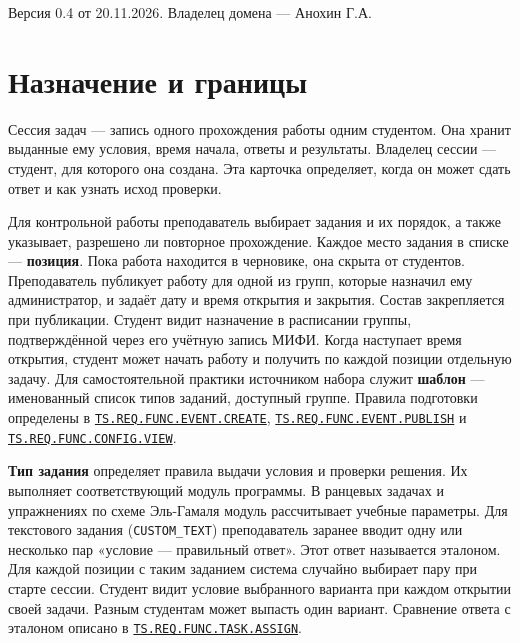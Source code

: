 \documentclass[12pt,a4paper]{article}
\begin{document}
\hypertarget{карточка-домена-сессии-задач}{}

Версия 0.4 от 20.11.2026. Владелец домена --- Анохин Г.А.

\section{Назначение и границы}\label{ux43dux430ux437ux43dux430ux447ux435ux43dux438ux435-ux438-ux433ux440ux430ux43dux438ux446ux44b}

\hypertarget{назначение-и-границы}{}

Сессия задач --- запись одного прохождения работы одним студентом. Она хранит выданные ему условия, время начала, ответы и результаты. Владелец сессии --- студент, для которого она создана. Эта карточка определяет, когда он может сдать ответ и как узнать исход проверки.

Для контрольной работы преподаватель выбирает задания и их порядок, а также указывает, разрешено ли повторное прохождение. Каждое место задания в списке --- \textbf{позиция}. Пока работа находится в черновике, она скрыта от студентов. Преподаватель публикует работу для одной из групп, которые назначил ему администратор, и задаёт дату и время открытия и закрытия. Состав закрепляется при публикации. Студент видит назначение в расписании группы, подтверждённой через его учётную запись МИФИ. Когда наступает время открытия, студент может начать работу и получить по каждой позиции отдельную задачу. Для самостоятельной практики источником набора служит \textbf{шаблон} --- именованный список типов заданий, доступный группе. Правила подготовки определены в {\href{../02\_Техническое\_задание/DOC-02\_Техническое\_задание.pdf\#ts-req-func-event-create}{\texttt{TS.\allowbreak{}REQ.\allowbreak{}FUNC.\allowbreak{}EVENT.\allowbreak{}CREATE}}}, {\href{../02\_Техническое\_задание/DOC-02\_Техническое\_задание.pdf\#ts-req-func-event-publish}{\texttt{TS.\allowbreak{}REQ.\allowbreak{}FUNC.\allowbreak{}EVENT.\allowbreak{}PUBLISH}}} и {\href{../02\_Техническое\_задание/DOC-02\_Техническое\_задание.pdf\#ts-req-func-config-view}{\texttt{TS.\allowbreak{}REQ.\allowbreak{}FUNC.\allowbreak{}CONFIG.\allowbreak{}VIEW}}}.

\textbf{Тип задания} определяет правила выдачи условия и проверки решения. Их выполняет соответствующий модуль программы. В ранцевых задачах и упражнениях по схеме Эль-Гамаля модуль рассчитывает учебные параметры. Для текстового задания (\texttt{CUSTOM\_\allowbreak{}TEXT}) преподаватель заранее вводит одну или несколько пар «условие --- правильный ответ». Этот ответ называется эталоном. Для каждой позиции с таким заданием система случайно выбирает пару при старте сессии. Студент видит условие выбранного варианта при каждом открытии своей задачи. Разным студентам может выпасть один вариант. Сравнение ответа с эталоном описано в {\href{../02\_Техническое\_задание/DOC-02\_Техническое\_задание.pdf\#ts-req-func-task-assign}{\texttt{TS.\allowbreak{}REQ.\allowbreak{}FUNC.\allowbreak{}TASK.\allowbreak{}ASSIGN}}}.
\end{document}
